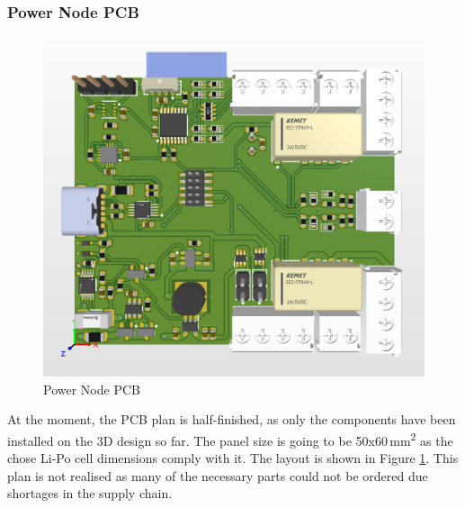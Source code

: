 \subsubsection{Power Node PCB}
\begin{figure}[!htb]
    \centering
    \includegraphics[width=\textwidth]{img/powerboardpcbkesz.png}
    \caption{Power Node PCB}
    \label{fig:powernodepcb}
\end{figure}
At the moment, the PCB plan is half-finished, as only the components have been installed on the 3D design so far. The panel size is going to be 50x60\,\si{\milli\metre\squared} as the chose Li-Po cell dimensions comply with it. The layout is shown in Figure \ref{fig:powernodepcb}. This plan is not realised as many of the necessary parts could not be ordered due shortages in the supply chain.